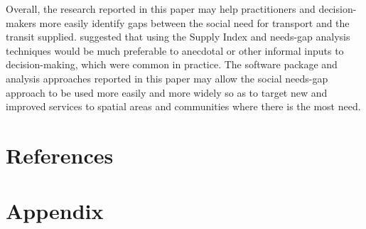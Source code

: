 \documentclass[preprint, 3p,
authoryear]{elsarticle} %
\begin{document}
Overall, the research reported in this paper may help practitioners and
decision-makers more easily identify gaps between the social need for
transport and the transit supplied. \citet{currie2010identifying}
suggested that using the Supply Index and needs-gap analysis techniques
would be much preferable to anecdotal or other informal inputs to
decision-making, which were common in practice. The software package and
analysis approaches reported in this paper may allow the social
needs-gap approach to be used more easily and more widely so as to
target new and improved services to spatial areas and communities where
there is the most need.

\section*{References}\label{references}

\section{Appendix}\label{appendix}
\end{document}
